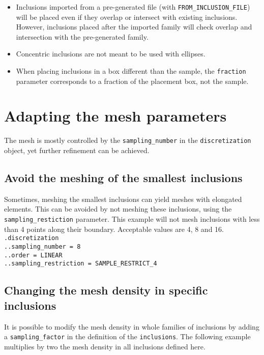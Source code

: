 \documentclass[10pt]{article}
\begin{document}
\begin{itemize}
	\item Inclusions imported from a pre-generated file (with \verb+FROM_INCLUSION_FILE+) will be placed even if they overlap or intersect with existing inclusions. However, inclusions placed after the imported family will check overlap and intersection with the pre-generated family.
	\item Concentric inclusions are not meant to be used with ellipses.
	\item When placing inclusions in a box different than the sample, the \verb+fraction+ parameter corresponds to a fraction of the placement box, not the sample.
\end{itemize}

\section{Adapting the mesh parameters}

The mesh is mostly controlled by the \verb+sampling_number+ in the \verb+discretization+ object, yet further refinement can be achieved.

\subsection{Avoid the meshing of the smallest inclusions}

Sometimes, meshing the smallest inclusions can yield meshes with elongated elements. This can be avoided by not meshing these inclusions, using the \verb+sampling_restiction+ parameter. This example will not mesh inclusions with less than 4 points along their boundary. Acceptable values are 4, 8 and 16.\\

\noindent \verb+.discretization+\\
\verb+..sampling_number = 8+\\
\verb+..order = LINEAR+\\
\verb+..sampling_restriction = SAMPLE_RESTRICT_4+

\subsection{Changing the mesh density in specific inclusions}

It is possible to modify the mesh density in whole families of inclusions by adding a \verb+sampling_factor+ in the definition of the \verb+inclusions+. The following example multiplies by two the mesh density in all inclusions defined here.\\
\end{document}
